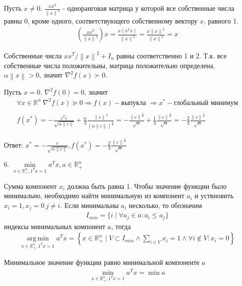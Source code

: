 \documentclass{article}
\DeclareMathOperator*{\argmin}{arg\,min}
\newcommand{\RV}[1] {\mathbb{R}^{#1}}
\newcommand{\norm}[1]{\left\lVert#1\right\rVert}
\begin{document}
    Пусть $ x \neq 0$. $\frac{xx^T}{\norm{x}^2}$ - одноранговая матрица у которой все собственные числа равны 0, кроме одного, соответствующего собственному вектору $x$, равного 1.
    \begin{align*}
        \left( \frac{xx^T}{\norm{x}^2}\right)x =
        \frac{x(x^Tx)}{\norm{x}^2} =
        \frac{x\norm{x}^2}{\norm{x}^2} = x        
    \end{align*}
    
    Собственные числа $xx^T/\norm{x}^2 + I_n$ равны соответственно 1 и 2. Т.к. все собственные числа положительны, матрица положительно определена, $\alpha\norm{x} > 0$, значит $\nabla^2 f(x) \succ 0$.
    
    Пусть $x = 0$. $\nabla^2 f(0) = 0$, значит
    \begin{align*}
        \forall x \in \RV{n} \: \nabla^2 f(x) \succeq 0 \Rightarrow f(x) - \text{выпукла } \Rightarrow x^* - \text{глобальный минимум}\\
        \\
        f(x^*) = -\frac{c^Tc}{\sqrt{\alpha\norm{c}}} +
        \frac{\alpha}{3}\frac{\norm{c}^3}{(\alpha\norm{c})^{\frac{3}{2}}} =
        -\frac{\norm{c}^{\frac{3}{2}}}{\sqrt{\alpha}} +
        \frac{1}{3}\frac{\norm{c}^{\frac{3}{2}}}{\sqrt{\alpha}} =
        -\frac{2}{3}\frac{\norm{c}^{\frac{3}{2}}}{\sqrt{\alpha}}
    \end{align*}
    
    Ответ: $x^* = -\frac{c}{\sqrt{\alpha\norm{c}}}, f(x^*) = -\frac{2}{3}\frac{\norm{c}^{\frac{3}{2}}}{\sqrt{\alpha}}$
    \bigbreak
    
    6.  $\min\limits_{x \in \RV{n}_+, 1^Tx = 1} a^Tx, a \in \RV{n}_+$
    
    Сумма компонент $x_i$ должна быть равна 1. Чтобы значение функции было минимально, необходимо найти минимальную из компонент $a_i$ и уствновить $x_i = 1, x_j = 0 \: j \neq i$. Если минимальны $a_i$ несколько, то обозначим
    \begin{align*}
        I_{min} = \{i \mid \forall a_j \in a : a_i \leq a_j\}
    \end{align*}
    индексы минимальных компонент $a$, тогда     
    \begin{align*}
        \argmin\limits_{x \in \RV{n}_+, 1^Tx = 1} a^Tx =
        \left\{x \in \RV{n}_+ \mid V \subset I_{min} \land \sum_{i \in V} x_i = 1 \land \forall i \notin V : x_i = 0 \right\}
    \end{align*}
    
    Минимальное значение функции равно минимальной компоненте $a$
    \begin{align*}
        \min\limits_{x \in \RV{n}_+, 1^Tx = 1} a^Tx = \min a
    \end{align*}
    \newpage
    
\end{document}

